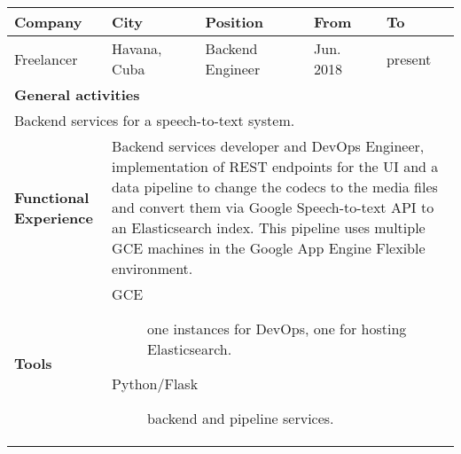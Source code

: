 


\begin{cventries}


 \begin{tabular}{|p{4.5cm} | p{2cm} | p{4cm} | p{2cm} | p{2cm}|}
  \hline
  \textbf{Company} & 
  \textbf{City} & 
  \textbf{Position} & 
  \textbf{From} & \textbf{To} \\
  \hline

  Freelancer & 
  Havana, Cuba & 
  Backend Engineer & 
  
  Jun. 2018 & present \\ 
  
  \hline

  \multicolumn{5}{|l|}{\textbf{General activities}} \\

   \multicolumn{5}{|p{15cm}|}{
     Backend services for a speech-to-text system.
     } \\
  \hline
  \textbf{Functional Experience} & \multicolumn{4}{p{12cm}|}{
   
   Backend services developer and DevOps Engineer, implementation of REST endpoints for the UI and a data pipeline to change the codecs to the media files and convert them via Google Speech-to-text API to an Elasticsearch index. This pipeline uses multiple GCE machines in the Google App Engine Flexible environment.

    } \\
    \hline
    \textbf{Tools} & \multicolumn{4}{p{12cm}|}{
                     \begin{description}
                     
                      \item[GCE] one instances for DevOps, one for hosting Elasticsearch.
                      
                      \item[Python/Flask] backend and pipeline services.
                    

\end{description}}
\end{tabular}
\end{cventries}

